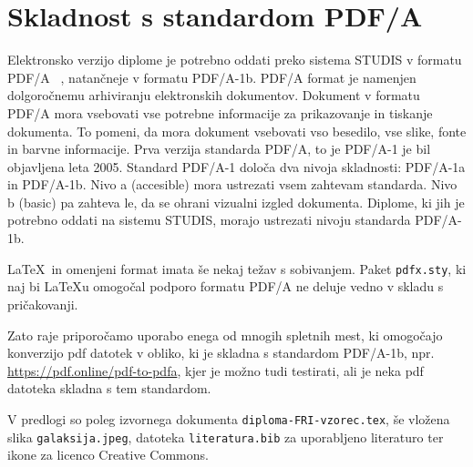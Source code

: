 \chapter{Skladnost s standardom PDF/A}
\label{PDF}

Elektronsko verzijo diplome je potrebno oddati preko sistema STUDIS v formatu PDF/A
~\cite{howtopdfa,pdfa}, natančneje v formatu PDF/A-1b.
PDF/A format je namenjen dolgoročnemu arhiviranju elektronskih dokumentov.
Dokument v formatu PDF/A mora vsebovati vse potrebne informacije za prikazovanje in tiskanje dokumenta.
To pomeni, da mora dokument vsebovati vso besedilo, vse slike, fonte in barvne informacije.
Prva verzija standarda PDF/A, to je PDF/A-1 je bil objavljena leta 2005.
Standard PDF/A-1 določa dva nivoja skladnosti: PDF/A-1a in PDF/A-1b.
Nivo a (accesible) mora ustrezati vsem zahtevam standarda.
Nivo b (basic) pa zahteva le, da se ohrani vizualni izgled dokumenta.
Diplome, ki jih je potrebno oddati na sistemu STUDIS, morajo ustrezati nivoju standarda PDF/A-1b.

\LaTeX\ in omenjeni format imata še nekaj težav s sobivanjem.
Paket \texttt{pdfx.sty}, ki naj bi \LaTeX{u} omogočal podporo formatu PDF/A ne deluje vedno
v skladu s pričakovanji.

Zato raje priporočamo uporabo enega od mnogih spletnih mest, ki omo\-go\-ča\-jo konverzijo pdf
datotek v obliko, ki je skladna s standardom PDF/A-1b, npr. \url{https://pdf.online/pdf-to-pdfa},
kjer je možno tudi testirati, ali je neka pdf datoteka skladna s tem standardom.

V predlogi so poleg izvornega dokumenta \texttt{diploma-FRI-vzorec.tex}, še vložena slika
\texttt{galaksija.jpeg}, datoteka \texttt{literatura.bib} za uporabljeno literaturo ter
ikone za licenco Creative Commons.
